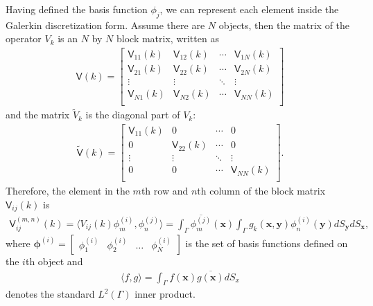 Having defined the basis function $\phi_j$, we can represent each element inside the Galerkin discretization form. Assume there are $N$ objects,
then the matrix of the operator $V_{k}$ is an $N$ by $N$ block matrix, written as 
\begin{align}\label{matrix V}
    \mathsf{V}(k) = \begin{bmatrix}
        \mathsf{V}_{11}(k) & \mathsf{V}_{12}(k) & \cdots & \mathsf{V}_{1N}(k) \\
        \mathsf{V}_{21}(k) & \mathsf{V}_{22}(k) & \cdots & \mathsf{V}_{2N}(k) \\
        \vdots & \vdots & \ddots & \vdots \\
        \mathsf{V}_{N1}(k) & \mathsf{V}_{N2}(k) & \cdots & \mathsf{V}_{NN}(k) \\
\end{bmatrix}
\end{align}
and the matrix $\tilde{V}_{k}$ is the diagonal part of $V_{k}$:
\begin{align}\label{matrix tilde V}
    \tilde{\mathsf{V}}(k) = \begin{bmatrix}
        \mathsf{V}_{11}(k) & 0      & \cdots & 0 \\
    0      & \mathsf{V}_{22}(k) & \cdots & 0\\
    \vdots & \vdots & \ddots & \vdots \\
    0      & 0      & \cdots & \mathsf{V}_{NN}(k) \\
\end{bmatrix}.
\end{align}
Therefore, the element in the $m$th row and $n$th column of the block matrix $\mathsf{V}_{ij}(k)$ is 
\begin{align}\label{Elements in matrix V}
    \mathsf{V}_{ij}^{(m,n)} (k) = \langle V_{ij}(k)\phi_{m}^{(i)}, \phi_{n}^{(j)}\rangle = 
    \int_{\Gamma}\overline{\phi_{m}^{(j)}}(\boldsymbol{x})\int_{\Gamma}g_{k}(\boldsymbol{x}, \boldsymbol{y})\phi_{n}^{(i)}(\boldsymbol{y})dS_{\boldsymbol{y}}dS_{\boldsymbol{x}},
\end{align}
where $\boldsymbol{\phi}^{(i)} = \begin{bmatrix}
    \phi_{1}^{(i)} & \phi_{2}^{(i)} & \dots & \phi_{N}^{(i)}
\end{bmatrix}$ is the set of basis functions defined on the $i$th object and 
\begin{align*}
    \langle f, g \rangle = \int_{\Gamma}{f(\boldsymbol{x})}\overline{g(\boldsymbol{x})}dS_{x}
\end{align*}
denotes the standard $L^{2}(\Gamma)$ inner product.


